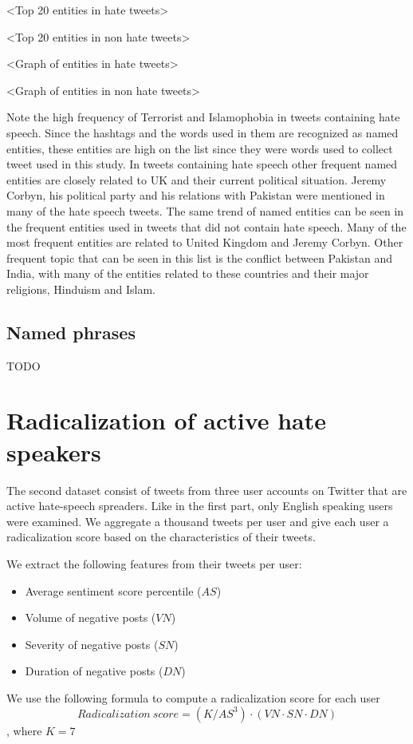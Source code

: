 \documentclass[conference]{IEEEtran}
\begin{document}
<Top 20 entities in hate tweets>

<Top 20 entities in non hate tweets>

<Graph of entities in hate tweets>

<Graph of entities in non hate tweets>

Note the high frequency of Terrorist and Islamophobia in tweets containing hate speech. Since the hashtags and the words used in them are recognized as named entities, these entities are high on the list since they were words used to collect tweet used in this study.
In tweets containing hate speech other frequent named entities are closely related to UK and their current political situation. Jeremy Corbyn, his political party and his relations with Pakistan were mentioned in many of the hate speech tweets.
The same trend of named entities can be seen in the frequent entities used in tweets that did not contain hate speech. Many of the most frequent entities are related to United Kingdom and Jeremy Corbyn. Other frequent topic that can be seen in this list is the conflict between Pakistan and India, with many of the entities related to these countries and their major religions, Hinduism and Islam.

\subsection{Named phrases}
TODO
\section{Radicalization of active hate speakers}
The second dataset consist of tweets from three user accounts on Twitter that are active hate-speech spreaders. Like in the first part, only English speaking users were examined.
We aggregate a thousand tweets per user and give each user a radicalization score based on the characteristics of their tweets.

We extract the following features from their tweets per user:
\begin{itemize}
  \item Average sentiment score percentile (\(AS\))
  \item Volume of negative posts (\(VN\))
  \item Severity of negative posts (\(SN\))
  \item Duration of negative posts (\(DN\))
\end{itemize}
We use the following formula to compute a radicalization score for each user
\[Radicalization\: score = (K /AS^3) \cdot (VN \cdot SN \cdot DN)\], where \(K = 7\)
\end{document}
